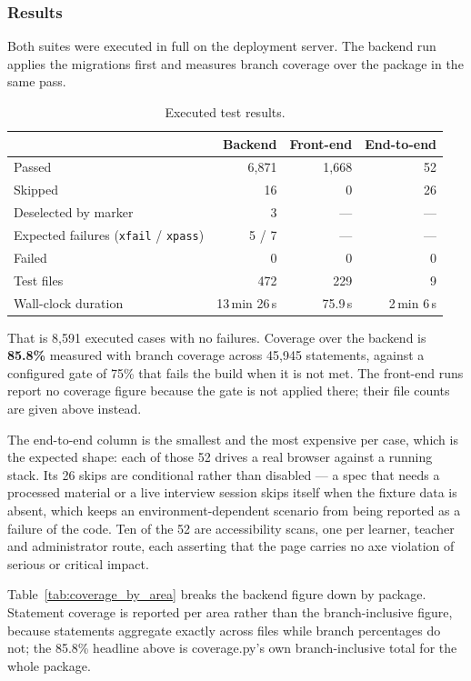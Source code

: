 \subsubsection{Results}

Both suites were executed in full on the deployment server. The backend run
applies the migrations first and measures branch coverage over the
 package in the same pass.

\begin{table}[H]
\centering
\caption{Executed test results.}
\label{tab:test_results}
\renewcommand{\arraystretch}{1.35}
\begin{tabular}{|l|r|r|r|}
\hline
 & \textbf{Backend} & \textbf{Front-end} & \textbf{End-to-end} \\ \hline
Passed & 6{,}871 & 1{,}668 & 52 \\ \hline
Skipped & 16 & 0 & 26 \\ \hline
Deselected by marker & 3 & --- & --- \\ \hline
Expected failures (\texttt{xfail} / \texttt{xpass}) & 5 / 7 & --- & --- \\ \hline
Failed & 0 & 0 & 0 \\ \hline
Test files & 472 & 229 & 9 \\ \hline
Wall-clock duration & 13\,min 26\,s & 75.9\,s & 2\,min 6\,s \\ \hline
\end{tabular}
\end{table}

That is 8{,}591 executed cases with no failures. Coverage over the backend is
\textbf{85.8\%} measured with branch coverage across 45{,}945 statements,
against a configured gate of 75\% that fails the build when it is not met. The
front-end runs report no coverage figure because the gate is not applied there;
their file counts are given above instead.

The end-to-end column is the smallest and the most expensive per case, which is
the expected shape: each of those 52 drives a real browser against a running
stack. Its 26 skips are conditional rather than disabled --- a spec that needs a
processed material or a live interview session skips itself when the fixture
data is absent, which keeps an environment-dependent scenario from being
reported as a failure of the code. Ten of the 52 are accessibility scans, one
per learner, teacher and administrator route, each asserting that the page
carries no axe violation of serious or critical impact.

Table~\ref{tab:coverage_by_area} breaks the backend figure down by package.
Statement coverage is reported per area rather than the branch-inclusive
figure, because statements aggregate exactly across files while branch
percentages do not; the 85.8\% headline above is coverage.py's own
branch-inclusive total for the whole package.

